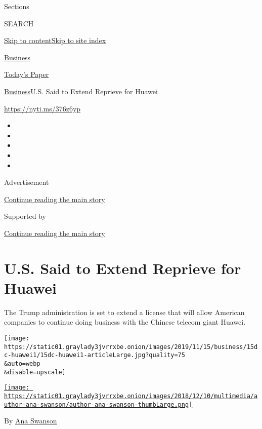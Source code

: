 Sections

SEARCH

\protect\hyperlink{site-content}{Skip to
content}\protect\hyperlink{site-index}{Skip to site index}

\href{https://www.nytimes3xbfgragh.onion/section/business}{Business}

\href{https://myaccount.nytimes3xbfgragh.onion/auth/login?response_type=cookie\&client_id=vi}{}

\href{https://www.nytimes3xbfgragh.onion/section/todayspaper}{Today's
Paper}

\href{/section/business}{Business}\textbar{}U.S. Said to Extend Reprieve
for Huawei

\url{https://nyti.ms/376z6yp}

\begin{itemize}
\item
\item
\item
\item
\item
\end{itemize}

Advertisement

\protect\hyperlink{after-top}{Continue reading the main story}

Supported by

\protect\hyperlink{after-sponsor}{Continue reading the main story}

\hypertarget{us-said-to-extend-reprieve-for-huawei}{%
\section{U.S. Said to Extend Reprieve for
Huawei}\label{us-said-to-extend-reprieve-for-huawei}}

The Trump administration is set to extend a license that will allow
American companies to continue doing business with the Chinese telecom
giant Huawei.

\texttt{[image: https://static01.graylady3jvrrxbe.onion/images/2019/11/15/business/15dc-huawei1/15dc-huawei1-articleLarge.jpg?quality=75\\\&auto=webp\\\&disable=upscale]}

\href{https://www.nytimes3xbfgragh.onion/by/ana-swanson}{\texttt{[image: https://static01.graylady3jvrrxbe.onion/images/2018/12/10/multimedia/author-ana-swanson/author-ana-swanson-thumbLarge.png]}}

By \href{https://www.nytimes3xbfgragh.onion/by/ana-swanson}{Ana Swanson}

